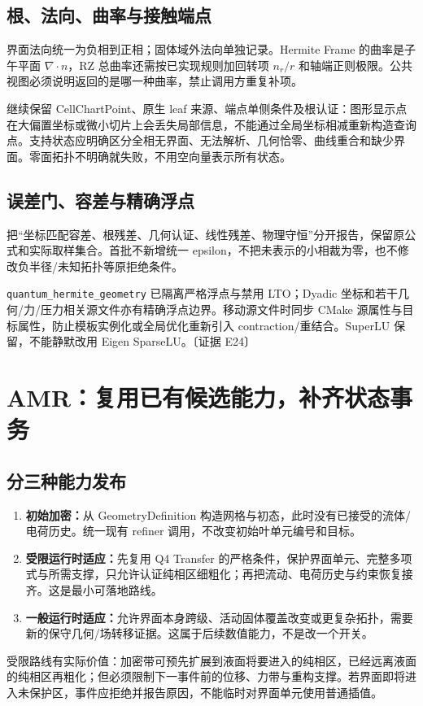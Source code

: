 \documentclass[UTF8,a4paper,11pt,fontset=fandol]{ctexart}
\newcommand{\code}[1]{\nolinkurl{#1}}
\newcommand{\ev}[1]{{\small\color{muted}〔证据 #1〕}}
\begin{document}
\subsection{根、法向、曲率与接触端点}
界面法向统一为负相到正相；固体域外法向单独记录。Hermite Frame 的曲率是子午平面 $\nabla\cdot n$，RZ 总曲率还需按已实现规则加回转项 $n_r/r$ 和轴端正则极限。公共视图必须说明返回的是哪一种曲率，禁止调用方重复补项。

继续保留 CellChartPoint、原生 leaf 来源、端点单侧条件及根认证：图形显示点在大偏置坐标或微小切片上会丢失局部信息，不能通过全局坐标相减重新构造查询点。支持状态应明确区分全相无界面、无法解析、几何恰零、曲线重合和缺少界面。零面拓扑不明确就失败，不用空向量表示所有状态。

\subsection{误差门、容差与精确浮点}
把“坐标匹配容差、根残差、几何认证、线性残差、物理守恒”分开报告，保留原公式和实际取样集合。首批不新增统一 epsilon，不把未表示的小相裁为零，也不修改负半径/未知拓扑等原拒绝条件。

\code{quantum_hermite_geometry} 已隔离严格浮点与禁用 LTO；Dyadic 坐标和若干几何/力/压力相关源文件亦有精确浮点边界。移动源文件时同步 CMake 源属性与目标属性，防止模板实例化或全局优化重新引入 contraction/重结合。SuperLU 保留，不能静默改用 Eigen SparseLU。\ev{E24}

\clearpage
\section{AMR：复用已有候选能力，补齐状态事务}
\subsection{分三种能力发布}
\begin{enumerate}
\item \textbf{初始加密：}从 GeometryDefinition 构造网格与初态，此时没有已接受的流体/电荷历史。统一现有 refiner 调用，不改变初始叶单元编号和目标。
\item \textbf{受限运行时适应：}先复用 Q4 Transfer 的严格条件，保护界面单元、完整多项式与所需支撑，只允许认证纯相区细粗化；再把流动、电荷历史与约束恢复接齐。这是最小可落地路线。
\item \textbf{一般运行时适应：}允许界面本身跨级、活动固体覆盖改变或更复杂拓扑，需要新的保守几何/场转移证据。这属于后续数值能力，不是改一个开关。
\end{enumerate}
受限路线有实际价值：加密带可预先扩展到液面将要进入的纯相区，已经远离液面的纯相区再粗化；但必须限制下一事件前的位移、力带与重构支撑。若界面即将进入未保护区，事件应拒绝并报告原因，不能临时对界面单元使用普通插值。
\end{document}
